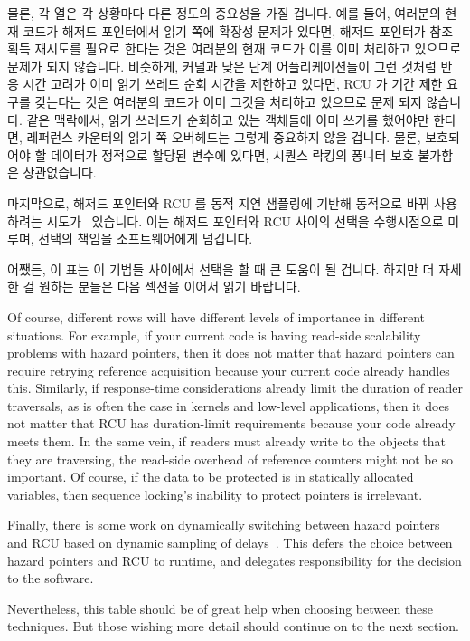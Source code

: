 물론, 각 열은 각 상황마다 다른 정도의 중요성을 가질 겁니다.
예를 들어, 여러분의 현재 코드가 해저드 포인터에서 읽기 쪽에 확장성 문제가
있다면, 해저드 포인터가 참조 획득 재시도를 필요로 한다는 것은 여러분의 현재
코드가 이를 이미 처리하고 있으므로 문제가 되지 않습니다.
비슷하게, 커널과 낮은 단계 어플리케이션들이 그런 것처럼 반응 시간 고려가 이미
읽기 쓰레드 순회 시간을 제한하고 있다면, RCU 가 기간 제한 요구를 갖는다는 것은
여러분의 코드가 이미 그것을 처리하고 있으므로 문제 되지 않습니다.
같은 맥락에서, 읽기 쓰레드가 순회하고 있는 객체들에 이미 쓰기를 했어야만
한다면, 레퍼런스 카운터의 읽기 쪽 오버헤드는 그렇게 중요하지 않을 겁니다.
물론, 보호되어야 할 데이터가 정적으로 할당된 변수에 있다면, 시퀀스 락킹의
퐁니터 보호 불가함은 상관없습니다.

마지막으로, 해저드 포인터와 RCU 를 동적 지연 샘플링에 기반해 동적으로 바꿔
사용하려는 시도가~\cite{Balmau:2016:FRM:2935764.2935790} 있습니다.
이는 해저드 포인터와 RCU 사이의 선택을 수행시점으로 미루며, 선택의 책임을
소프트웨어에게 넘깁니다.

어쨌든, 이 표는 이 기법들 사이에서 선택을 할 때 큰 도움이 될 겁니다.
하지만 더 자세한 걸 원하는 분들은 다음 섹션을 이어서 읽기 바랍니다.

\iffalse

Of course, different rows will have different levels of importance in
different situations.
For example, if your current code is having read-side scalability problems
with hazard pointers, then it does not matter that hazard pointers can require
retrying reference acquisition because your current code already handles
this.
Similarly, if response-time considerations already limit the duration
of reader traversals, as is often the case in kernels and low-level
applications, then it does not matter that RCU has duration-limit
requirements because your code already meets them.
In the same vein, if readers must already write to the objects that they
are traversing, the read-side overhead of reference counters might
not be so important.
Of course, if the data to be protected is in statically allocated variables,
then sequence locking's inability to protect pointers is irrelevant.

Finally, there is some work on dynamically switching between hazard
pointers and RCU based on dynamic sampling of
delays~\cite{Balmau:2016:FRM:2935764.2935790}.
This defers the choice between hazard pointers and RCU to runtime,
and delegates responsibility for the decision to the software.

Nevertheless, this table should be of great help when choosing between
these techniques.
But those wishing more detail should continue on to the next section.

